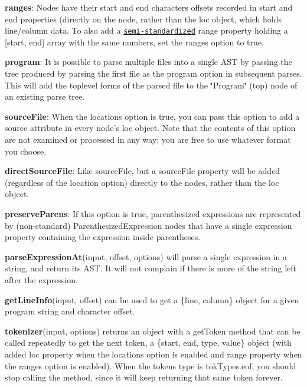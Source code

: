 \begin{DoxyItemize}
\item {\bfseries ranges}\+: Nodes have their start and end characters offsets recorded in {\ttfamily start} and {\ttfamily end} properties (directly on the node, rather than the {\ttfamily loc} object, which holds line/column data. To also add a \href{https://bugzilla.mozilla.org/show_bug.cgi?id=745678}{\tt semi-\/standardized} {\ttfamily range} property holding a {\ttfamily \mbox{[}start, end\mbox{]}} array with the same numbers, set the {\ttfamily ranges} option to {\ttfamily true}.
\item {\bfseries program}\+: It is possible to parse multiple files into a single A\+ST by passing the tree produced by parsing the first file as the {\ttfamily program} option in subsequent parses. This will add the toplevel forms of the parsed file to the \char`\"{}\+Program\char`\"{} (top) node of an existing parse tree.
\item {\bfseries source\+File}\+: When the {\ttfamily locations} option is {\ttfamily true}, you can pass this option to add a {\ttfamily source} attribute in every node’s {\ttfamily loc} object. Note that the contents of this option are not examined or processed in any way; you are free to use whatever format you choose.
\item {\bfseries direct\+Source\+File}\+: Like {\ttfamily source\+File}, but a {\ttfamily source\+File} property will be added (regardless of the {\ttfamily location} option) directly to the nodes, rather than the {\ttfamily loc} object.
\item {\bfseries preserve\+Parens}\+: If this option is {\ttfamily true}, parenthesized expressions are represented by (non-\/standard) {\ttfamily Parenthesized\+Expression} nodes that have a single {\ttfamily expression} property containing the expression inside parentheses.
\end{DoxyItemize}

{\bfseries parse\+Expression\+At}{\ttfamily (input, offset, options)} will parse a single expression in a string, and return its A\+ST. It will not complain if there is more of the string left after the expression.

{\bfseries get\+Line\+Info}{\ttfamily (input, offset)} can be used to get a {\ttfamily \{line, column\}} object for a given program string and character offset.

{\bfseries tokenizer}{\ttfamily (input, options)} returns an object with a {\ttfamily get\+Token} method that can be called repeatedly to get the next token, a {\ttfamily \{start, end, type, value\}} object (with added {\ttfamily loc} property when the {\ttfamily locations} option is enabled and {\ttfamily range} property when the {\ttfamily ranges} option is enabled). When the token\textquotesingle{}s type is {\ttfamily tok\+Types.\+eof}, you should stop calling the method, since it will keep returning that same token forever.

